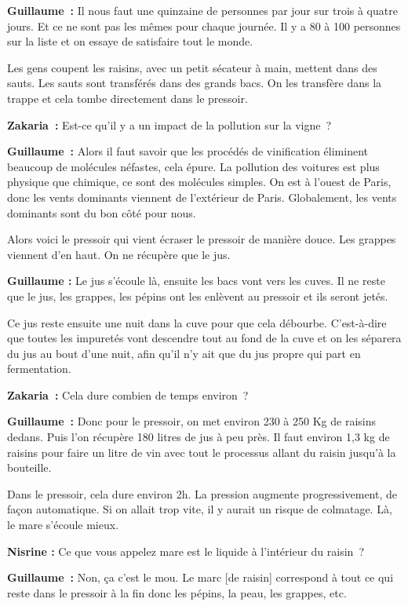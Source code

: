 \documentclass[a4paper, titlepage]{report}
\begin{document}
\textbf{Guillaume~:} Il nous faut une quinzaine de personnes par jour
sur trois à quatre jours. Et ce ne sont pas les mêmes pour chaque
journée. Il y a 80 à 100 personnes sur la liste et on essaye de
satisfaire tout le monde.

Les gens coupent les raisins, avec un petit sécateur à main, mettent
dans des sauts. Les sauts sont transférés dans des grands bacs. On les
transfère dans la trappe et cela tombe directement dans le
pressoir.

\textbf{Zakaria~:} Est-ce qu'il y a un impact de la pollution sur la
vigne~?

\textbf{Guillaume~:} Alors il faut savoir que les procédés de
vinification éliminent beaucoup de molécules néfastes, cela épure. La
pollution des voitures est plus physique que chimique, ce sont des
molécules simples. On est à l'ouest de Paris, donc les vents dominants
viennent de l'extérieur de Paris. Globalement, les vents dominants sont
du bon côté pour nous.

Alors voici le pressoir qui vient écraser le pressoir de manière douce.
Les grappes viennent d'en haut. On ne récupère que le jus.

\textbf{Guillaume :} Le jus s'écoule là, ensuite les bacs vont vers les
cuves. Il ne reste que le jus, les grappes, les pépins ont les enlèvent
au pressoir et ils seront jetés.

Ce jus reste ensuite une nuit dans la cuve pour que cela débourbe.
C'est-à-dire que toutes les impuretés vont descendre tout au fond de la
cuve et on les séparera du jus au bout d'une nuit, afin qu'il n'y ait
que du jus propre qui part en fermentation.

\textbf{Zakaria~:} Cela dure combien de temps environ~?

\textbf{Guillaume~:} Donc pour le pressoir, on met environ 230 à 250 Kg
de raisins dedans. Puis l'on récupère 180 litres de jus à peu près. Il
faut environ 1,3 kg de raisins pour faire un litre de vin avec tout le
processus allant du raisin jusqu'à la bouteille.

Dans le pressoir, cela dure environ 2h. La pression augmente
progressivement, de façon automatique. Si on allait trop vite, il y
aurait un risque de colmatage. Là, le mare s'écoule mieux.

\textbf{Nisrine :} Ce que vous appelez mare est le liquide à l'intérieur
du raisin~?

\textbf{Guillaume~:} Non, ça c'est le mou. Le marc {[}de raisin{]}
correspond à tout ce qui reste dans le pressoir à la fin donc les
pépins, la peau, les grappes, etc.
\end{document}

